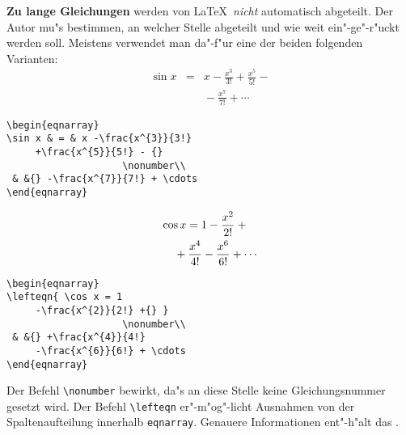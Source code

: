 \textbf{Zu lange Gleichungen} werden von \LaTeX\ \textit{nicht}
automatisch abgeteilt.
Der Autor mu"s bestimmen, an welcher Stelle abgeteilt und wie
weit ein"-ge"-r"uckt werden soll.
Meistens verwendet man da"-f"ur eine der beiden folgenden
Varianten:
\exa
\begin{eqnarray}
\sin x & = & x -\frac{x^{3}}{3!}
     +\frac{x^{5}}{5!} - {} %
                    \nonumber\\
 & &{} -\frac{x^{7}}{7!} + \cdots %
\end{eqnarray}
\exb
\begin{verbatim}
\begin{eqnarray}
\sin x & = & x -\frac{x^{3}}{3!}
     +\frac{x^{5}}{5!} - {} 
                    \nonumber\\
 & &{} -\frac{x^{7}}{7!} + \cdots
\end{eqnarray}
\end{verbatim}
\exc
\exa
\begin{eqnarray}
\lefteqn{ \cos x = 1
     -\frac{x^{2}}{2!} + {} }
                    \nonumber\\
 & & {} +\frac{x^{4}}{4!}
     -\frac{x^{6}}{6!} + \cdots
\end{eqnarray}
\exb
\begin{verbatim}
\begin{eqnarray}
\lefteqn{ \cos x = 1
     -\frac{x^{2}}{2!} +{} }
                    \nonumber\\
 & &{} +\frac{x^{4}}{4!}
     -\frac{x^{6}}{6!} + \cdots
\end{eqnarray}
\end{verbatim}
\exc
Der Befehl \verb|\nonumber| bewirkt, da"s an diese Stelle keine
Gleichungsnummer gesetzt wird.
Der Befehl \verb|\lefteqn| er"-m"og"-licht Ausnahmen von der
Spaltenaufteilung innerhalb \texttt{eqnarray}. 
Genauere Informationen ent"-h"alt das \manual.

\endinput
